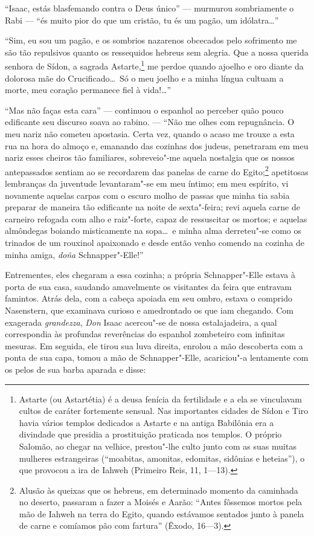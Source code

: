 ``Isaac, estás blasfemando contra o Deus único'' --- murmurou sombriamente o
Rabi --- ``és muito pior do que um cristão, tu és um pagão, um
idólatra\ldots''

``Sim, eu sou um pagão, e os sombrios nazarenos obcecados pelo sofrimento
me são tão repulsivos quanto os ressequidos hebreus sem alegria. Que a
nossa querida senhora de Sídon, a sagrada
Astarte,\footnote{ Astarte
(ou Astartétia) é a deusa fenícia da fertilidade e a ela se vinculavam
cultos de caráter fortemente sensual. Nas importantes cidades de Sídon
e Tiro havia vários templos dedicados a Astarte e na antiga Babilônia
era a divindade que presidia a prostituição praticada nos templos. O
próprio Salomão, ao chegar na velhice, prestou"-lhe culto junto com as
suas muitas mulheres estrangeiras (``moabitas, amonitas, edomitas,
sidônias e heteias''), o que provocou a ira de Iahweh (Primeiro Reis,
11, 1---13).} me perdoe quando ajoelho e oro diante da dolorosa mãe do
Crucificado\ldots\ Só o meu joelho e a minha língua cultuam a morte, meu
coração permanece fiel à vida!\ldots''

``Mas não faças esta cara'' --- continuou o espanhol ao perceber quão pouco
edificante seu discurso soava ao rabino. --- ``Não me olhes com
repugnância. O meu nariz não cometeu apostasia. Certa vez, quando o
acaso me trouxe a esta rua na hora do almoço e, emanando das cozinhas
dos judeus, penetraram em meu nariz esses cheiros tão familiares,
sobreveio"-me aquela nostalgia que os nossos antepassados sentiam ao
se recordarem das panelas de carne do
Egito;\footnote{ Alusão às
queixas que os hebreus, em determinado momento da caminhada no deserto,
passaram a fazer a Moisés e Aarão: ``Antes fôssemos mortos pela mão de
Iahweh na terra do Egito, quando estávamos sentados junto à panela de
carne e comíamos pão com fartura'' (Êxodo, 16---3). }
 apetitosas lembranças da juventude levantaram"-se em meu íntimo; em
meu espírito, vi novamente aquelas carpas com o escuro molho de passas
que minha tia sabia preparar de maneira tão edificante na noite de
sexta"-feira; revi aquela carne de carneiro refogada com alho e
raiz"-forte, capaz de ressuscitar os mortos; e aquelas almôndegas
boiando misticamente na sopa\ldots\ e minha alma derreteu"-se como os
trinados de um rouxinol apaixonado e desde então venho comendo na
cozinha de minha amiga, \textit{doña} Schnapper"-Elle!''

Entrementes, eles chegaram a essa cozinha; a própria Schnapper"-Elle
estava à porta de sua casa, saudando amavelmente os visitantes da feira
que entravam famintos. Atrás dela, com a cabeça apoiada em seu ombro,
estava o comprido Nasenstern, que examinava curioso e amedrontado os
que iam chegando. Com exagerada \textit{grandezza}, \textit{Don} Isaac
acercou"-se de nossa estalajadeira, a qual correspondia às profundas
reverências do espanhol zombeteiro com infinitas mesuras. Em seguida,
ele tirou sua luva direita, enrolou a mão descoberta com a ponta de sua
capa, tomou a mão de Schnapper"-Elle, acariciou"-a lentamente com os
pelos de sua barba aparada e disse:

